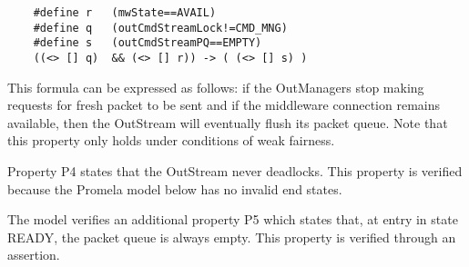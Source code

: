 \documentclass{pnp_article}
\begin{document}
\lstset{belowskip=-14pt} %
\begin{lstlisting}
	#define r	(mwState==AVAIL)
	#define q	(outCmdStreamLock!=CMD_MNG)
	#define s	(outCmdStreamPQ==EMPTY)
	((<> [] q)  && (<> [] r)) -> ( (<> [] s) )
\end{lstlisting}

This formula can be expressed as follows: if the OutManagers stop making requests for fresh packet to be sent and if the middleware connection remains available, then the OutStream will eventually flush its packet queue. Note that this property only holds under conditions of weak fairness. 

Property P4 states that the OutStream never deadlocks. This property is verified because the Promela model below has no invalid end states.

The model verifies an additional property P5 which states that, at entry in state READY, the packet queue is always empty. This property is verified through an assertion.

\lstset{belowskip=-1pt}	%

\end{document}
